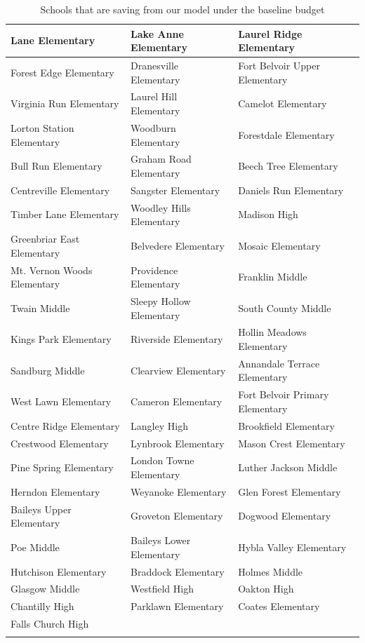 \documentclass{scrartcl}
\begin{document}
\begin{longtable}{|>{\raggedright\arraybackslash}p{}|>{\raggedright\arraybackslash}p{}|>{\raggedright\arraybackslash}p{}|}
    \hline
    Lane Elementary & Lake Anne Elementary & Laurel Ridge Elementary \\
    \hline
    Forest Edge Elementary & Dranesville Elementary & Fort Belvoir Upper Elementary \\
    \hline
    Virginia Run Elementary & Laurel Hill Elementary & Camelot Elementary \\
    \hline
    Lorton Station Elementary & Woodburn Elementary & Forestdale Elementary \\
    \hline
    Bull Run Elementary & Graham Road Elementary & Beech Tree Elementary \\
    \hline
    Centreville Elementary & Sangster Elementary & Daniels Run Elementary \\
    \hline
    Timber Lane Elementary & Woodley Hills Elementary & Madison High \\
    \hline
    Greenbriar East Elementary & Belvedere Elementary & Mosaic Elementary \\
    \hline
    Mt. Vernon Woods Elementary & Providence Elementary & Franklin Middle \\
    \hline
    Twain Middle & Sleepy Hollow Elementary & South County Middle \\
    \hline
    Kings Park Elementary & Riverside Elementary & Hollin Meadows Elementary \\
    \hline
    Sandburg Middle & Clearview Elementary & Annandale Terrace Elementary \\
    \hline
    West Lawn Elementary & Cameron Elementary & Fort Belvoir Primary Elementary \\
    \hline
    Centre Ridge Elementary & Langley High & Brookfield Elementary \\
    \hline
    Crestwood Elementary & Lynbrook Elementary & Mason Crest Elementary \\
    \hline
    Pine Spring Elementary & London Towne Elementary & Luther Jackson Middle \\
    \hline
    Herndon Elementary & Weyanoke Elementary & Glen Forest Elementary \\
    \hline
    Baileys Upper Elementary & Groveton Elementary & Dogwood Elementary \\
    \hline
    Poe Middle & Baileys Lower Elementary & Hybla Valley Elementary \\
    \hline
    Hutchison Elementary & Braddock Elementary & Holmes Middle \\
    \hline
    Glasgow Middle & Westfield High & Oakton High \\
    \hline
    Chantilly High & Parklawn Elementary & Coates Elementary \\
    \hline
    Falls Church High & & \\
    \hline
    \caption{Schools that are saving from our model under the baseline budget}
    \label{tab:schoolsavings}
\end{longtable}
\end{document}
